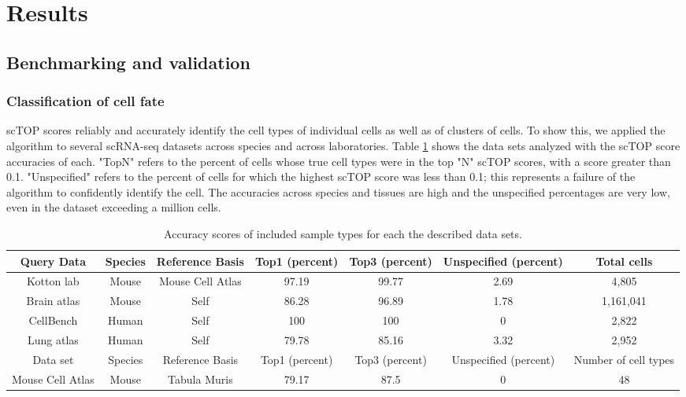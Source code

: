 \documentclass[aps,superscriptaddress, notitlepage,longbibliography]{revtex4-1}
\begin{document}
\section{Results}

\subsection{Benchmarking and validation}

\subsubsection{Classification of cell fate}
scTOP scores reliably and accurately identify the cell types of individual cells as well as of clusters of cells. To show this, we applied the algorithm to several scRNA-seq datasets across species and across laboratories. Table \ref{table:1} shows the data sets analyzed with the scTOP score accuracies of each. "TopN" refers to the percent of cells whose true cell types were in the top "N" scTOP scores, with a score greater than 0.1. "Unspecified" refers to the percent of cells for which the highest scTOP score was less than 0.1; this represents a failure of the algorithm to confidently identify the cell. The accuracies across species and tissues are high and the unspecified percentages are very low, even in the dataset exceeding a million cells. 

\begin{table}[h!]
\centering
\begin{tabular}{| c | c | c | c | c | c | c |}
\hline
Query Data & Species & Reference Basis & Top1 (percent) & Top3 (percent) & Unspecified (percent) & Total cells \\ 
\hline
Kotton lab & Mouse & Mouse Cell Atlas & 97.19 & 99.77 & 2.69 & 4,805 \\ 
\hline
Brain atlas & Mouse & Self & 86.28 & 96.89 & 1.78 & 1,161,041 \\
\hline
CellBench & Human & Self & 100 & 100 & 0 & 2,822 \\
\hline
Lung atlas & Human & Self & 79.78 & 85.16 & 3.32 & 2,952 \\  
\hline
\hline
Data set & Species & Reference Basis & Top1 (percent) & Top3 (percent) & Unspecified (percent) & Number of cell types \\
\hline
Mouse Cell Atlas & Mouse & Tabula Muris & 79.17 & 87.5 & 0 & 48 \\
\hline

\end{tabular}
\caption{Accuracy scores of included sample types for each the described data sets.}
\label{table:1}
\end{table}
\end{document}

